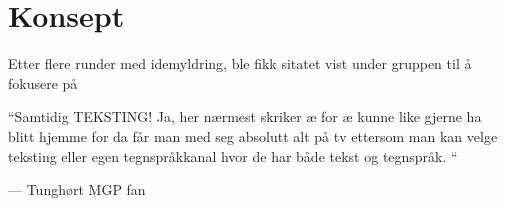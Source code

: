 
\section{Konsept}
\label{sec:konsept}
Etter flere runder med idemyldring, ble fikk sitatet vist under gruppen til å fokusere på 

\epigraphfontsize{\small\itshape}
\setlength\epigraphwidth{8cm}
\setlength\epigraphrule{0pt}
\epigraphfontsize{\small\itshape}
\label{quote:1}
\epigraph{“Samtidig TEKSTING! Ja, her nærmest skriker æ for æ kunne like gjerne ha blitt hjemme for da får man med seg absolutt alt på tv ettersom man kan velge teksting eller egen tegnspråkkanal hvor de har både tekst og tegnspråk. “}{--- \textup{Tunghørt MGP fan}}

